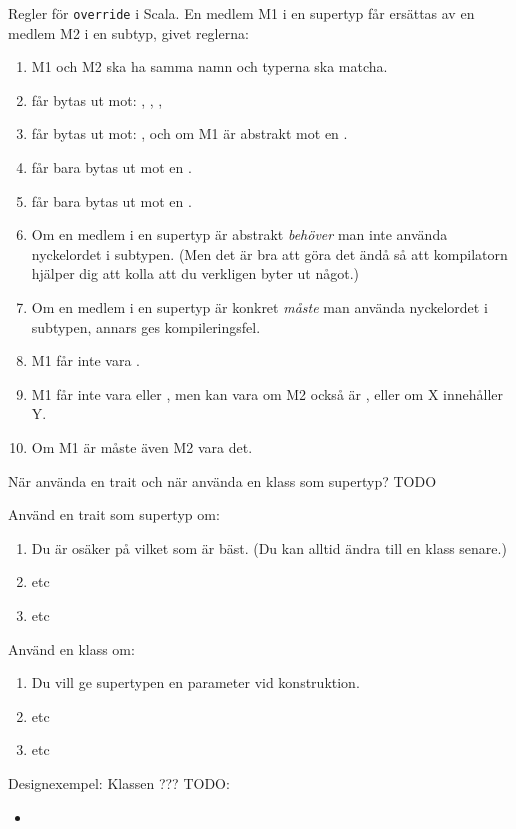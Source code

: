 \begin{Slide}{Regler för \texttt{override} i Scala.} \fontsize{8}{11}\selectfont
\label{slideW07:overriderules}
En medlem M1 i en supertyp får ersättas av en medlem M2 i en subtyp, givet reglerna:
\begin{enumerate}
\item M1 och M2 ska ha samma namn och typerna ska matcha.
\item {} får bytas ut mot: , , , 
\item {} får bytas ut mot: , och om M1 är abstrakt mot en .
\item {} får bara bytas ut mot en .
\item {} får bara bytas ut mot en .
\item Om en medlem i en supertyp är abstrakt \emph{behöver} man inte använda nyckelordet  i subtypen. (Men det är bra att göra det ändå så att kompilatorn hjälper dig att kolla att du verkligen byter ut något.) 
\item Om en medlem i en supertyp är konkret \emph{måste} man använda nyckelordet  i subtypen, annars ges kompileringsfel.
\item M1 får inte vara .
\item M1 får inte vara  eller , men kan vara  om M2 också är , eller  om X innehåller Y.   
\item Om M1 är  måste även M2 vara det.

\end{enumerate}
\end{Slide}


\begin{Slide}{När använda en trait och när använda en klass som supertyp?} 
\fontsize{9}{11}\selectfont
\label{slideW07:traitorclass}
TODO
\begin{multicols}{2}
Använd en trait som supertyp om:
\begin{enumerate}
\item Du är osäker på vilket som är bäst. (Du kan alltid ändra till en klass senare.)
\item etc
\item etc
\end{enumerate}

\columnbreak

Använd en klass om:
\begin{enumerate}
\item Du vill ge supertypen en parameter vid konstruktion.
\item etc
\item etc
\end{enumerate}


\end{multicols}
\end{Slide}



\begin{Slide}{Designexempel: Klassen ???}\small
TODO:
  \begin{itemize} 
  \item 
  \end{itemize}
\end{Slide}










